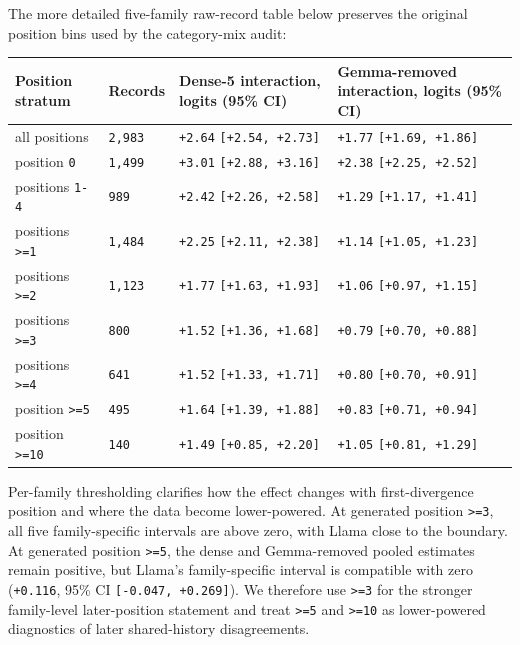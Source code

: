 \documentclass[11pt]{article}
\begin{document}
The more detailed five-family raw-record table below preserves the original position bins used by the category-mix audit:

\begin{table}[t]
\centering
\small
\setlength{\tabcolsep}{3pt}
\begin{tabularx}{\linewidth}{@{}>{\raggedright\arraybackslash}X >{\raggedright\arraybackslash}X >{\raggedright\arraybackslash}X >{\raggedright\arraybackslash}X@{}}
\toprule
Position stratum & Records & Dense-5 interaction, logits (95\% CI) & Gemma-removed interaction, logits (95\% CI) \\
\midrule
all positions & \texttt{2,983} & \texttt{+2.64} \texttt{[+2.54, +2.73]} & \texttt{+1.77} \texttt{[+1.69, +1.86]} \\
position \texttt{0} & \texttt{1,499} & \texttt{+3.01} \texttt{[+2.88, +3.16]} & \texttt{+2.38} \texttt{[+2.25, +2.52]} \\
positions \texttt{1-4} & \texttt{989} & \texttt{+2.42} \texttt{[+2.26, +2.58]} & \texttt{+1.29} \texttt{[+1.17, +1.41]} \\
positions \texttt{>=1} & \texttt{1,484} & \texttt{+2.25} \texttt{[+2.11, +2.38]} & \texttt{+1.14} \texttt{[+1.05, +1.23]} \\
positions \texttt{>=2} & \texttt{1,123} & \texttt{+1.77} \texttt{[+1.63, +1.93]} & \texttt{+1.06} \texttt{[+0.97, +1.15]} \\
positions \texttt{>=3} & \texttt{800} & \texttt{+1.52} \texttt{[+1.36, +1.68]} & \texttt{+0.79} \texttt{[+0.70, +0.88]} \\
positions \texttt{>=4} & \texttt{641} & \texttt{+1.52} \texttt{[+1.33, +1.71]} & \texttt{+0.80} \texttt{[+0.70, +0.91]} \\
position \texttt{>=5} & \texttt{495} & \texttt{+1.64} \texttt{[+1.39, +1.88]} & \texttt{+0.83} \texttt{[+0.71, +0.94]} \\
position \texttt{>=10} & \texttt{140} & \texttt{+1.49} \texttt{[+0.85, +2.20]} & \texttt{+1.05} \texttt{[+0.81, +1.29]} \\
\bottomrule
\end{tabularx}
\end{table}

Per-family thresholding clarifies how the effect changes with first-divergence position and where the data become lower-powered. At generated position \texttt{>=3}, all five family-specific intervals are above zero, with Llama close to the boundary. At generated position \texttt{>=5}, the dense and Gemma-removed pooled estimates remain positive, but Llama's family-specific interval is compatible with zero (\texttt{+0.116}, 95\% CI \texttt{[-0.047, +0.269]}). We therefore use \texttt{>=3} for the stronger family-level later-position statement and treat \texttt{>=5} and \texttt{>=10} as lower-powered diagnostics of later shared-history disagreements.
\end{document}
